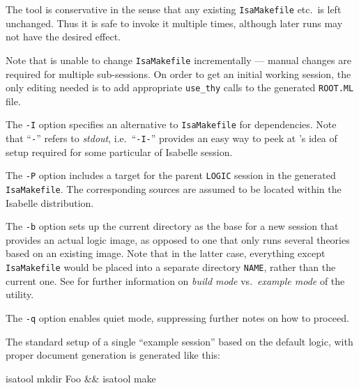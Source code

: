 \begin{isabellebody}
\begin{isamarkuptext}
  The \hyperlink{tool.mkdir}{\mbox{}} tool is conservative in the sense that any
  existing \verb|IsaMakefile| etc.\ is left unchanged.  Thus it
  is safe to invoke it multiple times, although later runs may not
  have the desired effect.

  Note that \hyperlink{tool.mkdir}{\mbox{}} is unable to change \verb|IsaMakefile|
  incrementally --- manual changes are required for multiple
  sub-sessions.  On order to get an initial working session, the only
  editing needed is to add appropriate \verb|use_thy| calls to the
  generated \verb|ROOT.ML| file.%
\end{isamarkuptext}%
\isamarkuptrue%
%
\isamarkuptrue%
%
\begin{isamarkuptext}%
The \verb|-I| option specifies an alternative to \verb|IsaMakefile| for dependencies.  Note that ``\verb|-|'' refers
  to \emph{stdout}, i.e.\ ``\verb|-I-|'' provides an easy way
  to peek at \hyperlink{tool.mkdir}{\mbox{}}'s idea of \hyperlink{tool.make}{\mbox{}} setup required for
  some particular of Isabelle session.

  \medskip The \verb|-P| option includes a target for the
  parent \verb|LOGIC| session in the generated \verb|IsaMakefile|.  The corresponding sources are assumed to be located
  within the Isabelle distribution.

  \medskip The \verb|-b| option sets up the current directory
  as the base for a new session that provides an actual logic image,
  as opposed to one that only runs several theories based on an
  existing image.  Note that in the latter case, everything except
  \verb|IsaMakefile| would be placed into a separate directory
  \verb|NAME|, rather than the current one.  See
   for further information on \emph{build
  mode} vs.\ \emph{example mode} of the \hyperlink{tool.usedir}{\mbox{}} utility.

  \medskip The \verb|-q| option enables quiet mode, suppressing
  further notes on how to proceed.%
\end{isamarkuptext}%
\isamarkuptrue%
%
\isamarkuptrue%
%
\begin{isamarkuptext}%
The standard setup of a single ``example session'' based on the
  default logic, with proper document generation is generated like
  this:
\begin{ttbox}
isatool mkdir Foo && isatool make
\end{ttbox}


\end{isamarkuptext}
\end{isabellebody}
